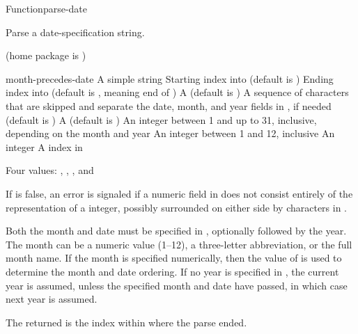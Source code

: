 \documentclass[10pt,twoside,english,pdftex]{article}
\begin{document}
\begin{functiondoc}{Function}{parse-date}{%
     
    }
% 

\fnsyntax

\fnpurpose Parse a date-specification string.

\fnpackage {} (home package is )

\fnmodule {}

\fnargs
\begin{args}{month-precedes-date}
\arg[string] A simple string
\arg[start] Starting index into  (default is )
\arg[end] Ending index into  (default is \nil, meaning
end of )
 A  (default is \nil)
\arg[separators] A sequence of characters that are skipped and separate the
 date, month, and year fields in , if needed (default is 
 )
 A  (default is 
)
\arg[date] An integer between 1 and up to 31, inclusive, depending
  on the month and year
\arg[month] An integer between 1 and 12, inclusive
\arg[year] An integer
\arg[position] A index in 
\end{args}

\fnreturns Four values: , , , and

\fnerrors
%
If  is false, an error is signaled if a numeric field in
 does not consist entirely of the representation of a integer,
possibly surrounded on either side by characters in .

\fndescription
%
Both the month and date must be specified in ,
optionally followed by the year. The month can be a numeric value (1--12), a
three-letter abbreviation, or the full month name.  If the month is specified
numerically, then the value of  is used to
determine the month and date ordering. If no year is specified in
, the current year is assumed, unless the specified month and date
have passed, in which case next year is assumed.

The returned  is the index within  where the
parse ended.


\end{functiondoc}
\end{document}
